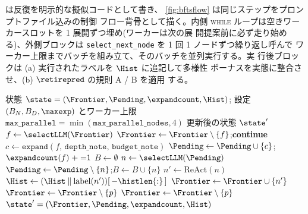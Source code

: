  は反復を明示的な擬似コードとして書き、
\cref{fig:bftsflow} は同じステップをプロンプトファイル込みの制御
フロー背骨として描く。内側 \textsc{while}
ループは空きワーカースロットを 1 展開ずつ埋め(ワーカーは次の展
開提案前に必ず走り始める)、外側ブロックは
\texttt{select\_next\_node} を 1 回 1 ノードずつ繰り返し呼んで
ワーカー上限までバッチを組み立て、そのバッチを並列実行する。実
行後ブロックは (a) 実行されたラベルを $\Hist$ に追記して多様性
ボーナスを実態に整合させ、(b) $\retirepred$ の規則 A / B を適用
する。

\begin{algorithm}[t]
\small
\caption{BFTS run-loop(外側ループ 1 反復)。}
\label{alg:bfts-run-loop}
\begin{algorithmic}[1]
\Require 状態 $\state=(\Frontier,\Pending,\expandcount,\Hist)$;
         設定 $(B_N, B_D, \maxexp)$ とワーカー上限
         $\texttt{max\_parallel}=\min(\texttt{max\_parallel\_nodes},4)$
\Ensure  更新後の状態 $\state'$
\State {}
  \State $f \gets \selectLLM(\Frontier)$ 
    \State $\Frontier \gets \Frontier \setminus \{f\}$;\;\;\textbf{continue}
  \EndIf
  \State $c \gets \texttt{expand}(f,\,\texttt{depth\_note},\,\texttt{budget\_note})$
  \State $\Pending \gets \Pending \cup \{c\}$;\;\;$\expandcount(f) \mathrel{+}{=} 1$
\EndWhile
\State {}
\State $B \gets \emptyset$
  \State $n \gets \selectLLM(\Pending)$ 
  \State $\Pending \gets \Pending \setminus \{n\}$;\;\;$B \gets B \cup \{n\}$
\EndWhile
{}
  \State $n' \gets \mathrm{ReAct}(n)$ 
  \State $\Hist \gets (\Hist \mathbin{\Vert} \mathrm{label}(n'))[\,-\histlen{:}\,]$ 
  \State $\Frontier \gets \Frontier \cup \{n'\}$
   
      \State $\Frontier \gets \Frontier \setminus \{p\}$
    \EndIf
  \EndFor
   
      \State $\Frontier \gets \Frontier \setminus \{p\}$
    \EndIf
  \EndFor
\EndFor
\State \Return $\state' = (\Frontier,\Pending,\expandcount,\Hist)$
\end{algorithmic}
\end{algorithm}

